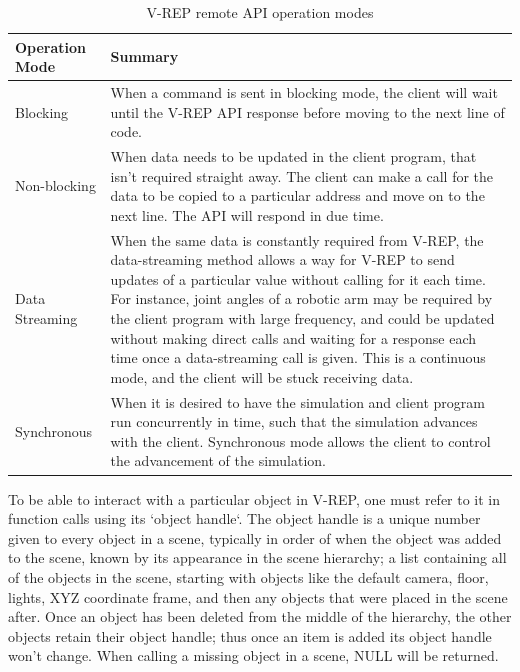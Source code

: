 \documentclass[12pt,openany,a4paper]{book}
\begin{document}
\begin{center}
\begin{table}[htb]

    \begin{tabular}{ | l | p{11cm} |}
    \hline
    Operation Mode & Summary \\ \hline
     Blocking & When a command is sent in blocking mode, the client will wait until the V-REP API response before moving to the next line of code.\\ \hline
    Non-blocking & When data needs to be updated in the client program, that isn't required straight away. The client can make a call for the data to be copied to a particular address and move on to the next line. The API will respond in due time.  \\ \hline
    Data Streaming & When the same data is constantly required from V-REP, the data-streaming method allows a way for V-REP to send updates of a particular value without calling for it each time. For instance, joint angles of a robotic arm may be required by the client program with large frequency, and could be updated without making direct calls and waiting for a response each time once a data-streaming call is given. This is a continuous mode, and the client will be stuck receiving data. \\
    \hline
    Synchronous & When it is desired to have the simulation and client program run concurrently in time, such that the simulation advances with the client. Synchronous mode allows the client to control the advancement of the simulation.\\
    \hline
    \end{tabular}
    \caption{V-REP remote API operation modes}
\end{table}
\end{center}

To be able to interact with a particular object in V-REP, one must refer to it in function calls using its `object handle`. The object handle is a unique number given to every object in a scene, typically in order of when the object was added to the scene, known by its appearance in the scene hierarchy; a list containing all of the objects in the scene, starting with objects like the default camera, floor, lights, XYZ coordinate frame, and then any objects that were placed in the scene after. Once an object has been deleted from the middle of the hierarchy, the other objects retain their object handle; thus once an item is added its object handle won't change. When calling a missing object in a scene, NULL will be returned.
\end{document}
